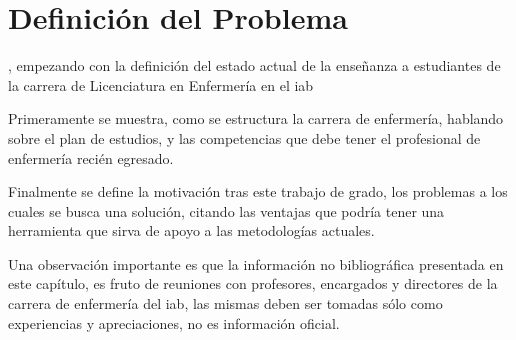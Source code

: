 \chapter{Definición del Problema}
\label{chap:problema}



, empezando con la definición del estado actual de la
enseñanza a estudiantes de la carrera de Licenciatura en Enfermería en el
\Gls{iab}


Primeramente se muestra, como se estructura la carrera de enfermería, hablando sobre
el plan de estudios, y las competencias que debe tener el profesional de
enfermería recién egresado.


Finalmente se define la motivación tras este trabajo de grado, los problemas a los
cuales se busca una solución, citando las ventajas que podría tener una herramienta
que sirva de apoyo a las metodologías actuales.

Una observación importante es que la información no bibliográfica presentada 
en este capítulo, es fruto de reuniones con profesores, encargados y directores 
de la carrera de enfermería del \Gls{iab}, las mismas deben ser tomadas sólo 
como experiencias y apreciaciones, no es información oficial. 




